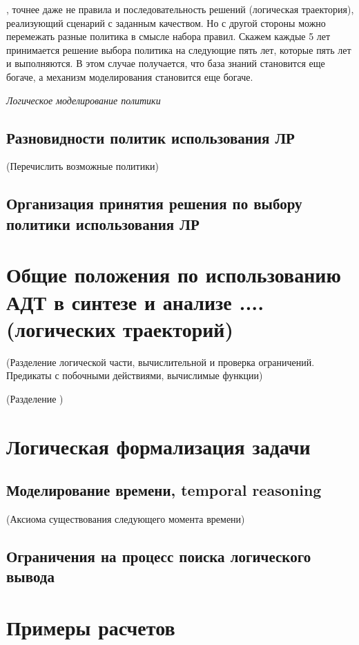 , точнее даже не правила и последовательность решений (логическая траектория), реализующий сценарий с заданным качеством. Но с другой стороны можно перемежать разные политика в смысле набора правил. Скажем каждые 5 лет принимается решение выбора политика на следующие пять лет, которые пять лет и выполняются. В этом случае получается, что база знаний становится еще богаче, а механизм моделирования становится еще богаче.

\emph{Логическое моделирование политики}

\subsection{Разновидности политик использования ЛР}
(Перечислить возможные политики)

\subsection{Организация принятия решения по выбору политики использования ЛР}

\section{Общие положения по использованию АДТ в синтезе и анализе .... (логических траекторий)}


(Разделение логической части, вычислительной и проверка ограничений. Предикаты с побочными действиями, вычислимые функции)

(Разделение )

\section{Логическая формализация задачи}

\subsection{Моделирование времени, temporal reasoning}
(Аксиома существования следующего момента времени)

\subsection{Ограничения на процесс поиска логического вывода}


\section{Примеры расчетов}


